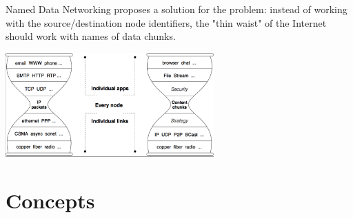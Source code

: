         Named Data Networking proposes a solution for the problem: instead of working with the source/destination node identifiers, the "thin waist" of the Internet should work with names of data chunks.

        \begin{center}\includegraphics[width=0.6\textwidth]{media/ndn_hourglass2.png}\end{center}

    \section{Concepts}
